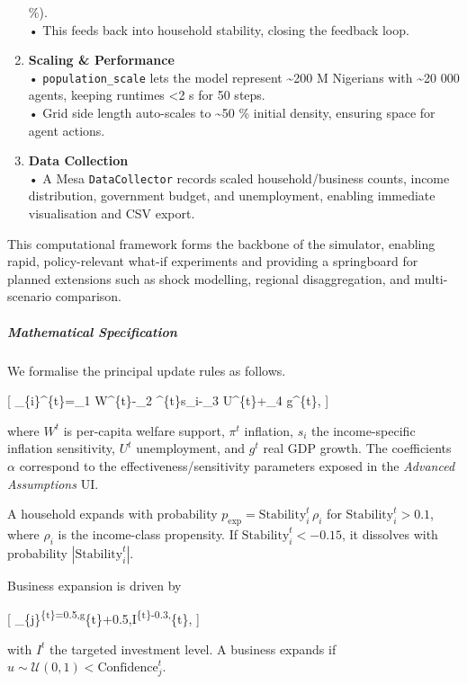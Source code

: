 \documentclass[
]{article}
\begin{document}
\begin{enumerate}
  \%).\\
  • This feeds back into household stability, closing the feedback loop.
\item
  \textbf{Scaling \& Performance}\\
  • \texttt{population\_scale} lets the model represent
  \textasciitilde200 M Nigerians with \textasciitilde20 000 agents,
  keeping runtimes \textless2 s for 50 steps.\\
  • Grid side length auto-scales to \textasciitilde50 \% initial
  density, ensuring space for agent actions.
\item
  \textbf{Data Collection}\\
  • A Mesa \texttt{DataCollector} records scaled household/business
  counts, income distribution, government budget, and unemployment,
  enabling immediate visualisation and CSV export.
\end{enumerate}

This computational framework forms the backbone of the simulator,
enabling rapid, policy-relevant what-if experiments and providing a
springboard for planned extensions such as shock modelling, regional
disaggregation, and multi-scenario comparison.

\subparagraph{Mathematical
Specification}\label{mathematical-specification}

We formalise the principal update rules as follows.

{[} \_\{i\}\^{}\{t\}=\alpha\_1 W\^{}\{t\}-\alpha\_2
\pi\^{}\{t\}s\_i-\alpha\_3 U\^{}\{t\}+\alpha\_4 g\^{}\{t\}, {]}

where \(W^{t}\) is per-capita welfare support, \(\pi^{t}\) inflation,
\(s_i\) the income-specific inflation sensitivity, \(U^{t}\)
unemployment, and \(g^{t}\) real GDP growth. The coefficients \(\alpha\)
correspond to the effectiveness/sensitivity parameters exposed in the
\emph{Advanced Assumptions} UI.

A household expands with probability
\(p_{\mathrm{exp}}=\mathrm{Stability}_{i}^{t}\,\rho_i\) for
\(\mathrm{Stability}_{i}^{t}>0.1\), where \(\rho_i\) is the income-class
propensity. If \(\mathrm{Stability}_{i}^{t}< -0.15\), it dissolves with
probability \(|\mathrm{Stability}_{i}^{t}|\).

Business expansion is driven by

{[}
\_\{j\}\textsuperscript{\{t\}=0.5,g}\{t\}+0.5,I\textsuperscript{\{t\}-0.3,\pi}\{t\},
{]}

with \(I^{t}\) the targeted investment level. A business expands if
\(u\sim\mathcal{U}(0,1)<\mathrm{Confidence}_{j}^{t}\).
\end{document}
